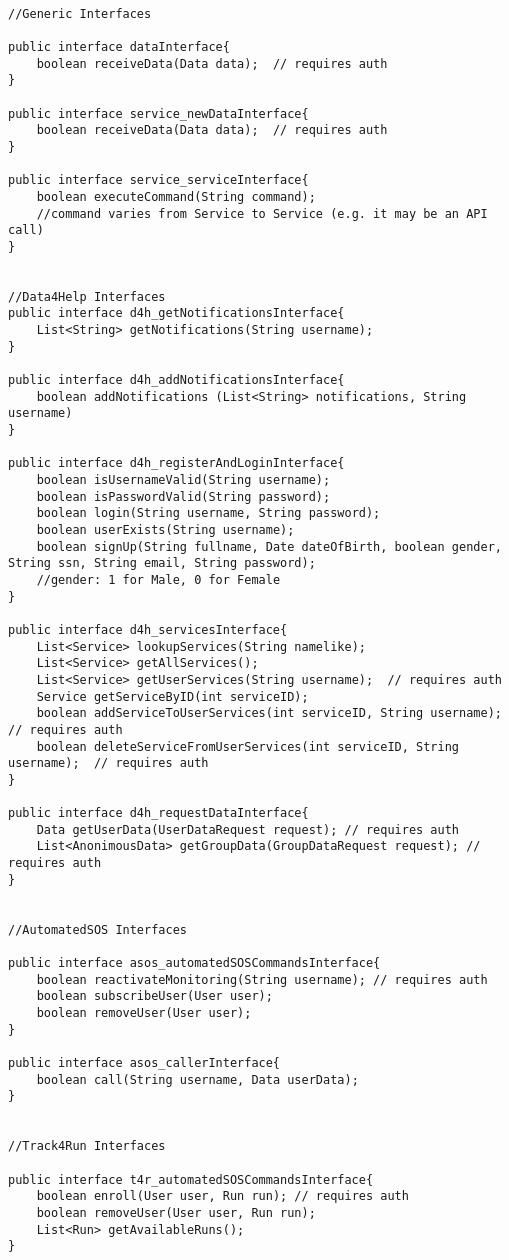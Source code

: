 \documentclass[../../DD.tex]{subfiles}
\begin{document}
\begin{lstlisting}

//Generic Interfaces

public interface dataInterface{
	boolean receiveData(Data data);  // requires auth
}

public interface service_newDataInterface{
	boolean receiveData(Data data);  // requires auth
}

public interface service_serviceInterface{
	boolean executeCommand(String command);
	//command varies from Service to Service (e.g. it may be an API call) 
}


//Data4Help Interfaces
public interface d4h_getNotificationsInterface{
	List<String> getNotifications(String username);
}

public interface d4h_addNotificationsInterface{
	boolean addNotifications (List<String> notifications, String username)
}

public interface d4h_registerAndLoginInterface{
	boolean isUsernameValid(String username);
	boolean isPasswordValid(String password);
	boolean login(String username, String password);
	boolean userExists(String username);
	boolean signUp(String fullname, Date dateOfBirth, boolean gender, String ssn, String email, String password);
	//gender: 1 for Male, 0 for Female
}

public interface d4h_servicesInterface{
	List<Service> lookupServices(String namelike);
	List<Service> getAllServices();
	List<Service> getUserServices(String username);  // requires auth
	Service getServiceByID(int serviceID);
	boolean addServiceToUserServices(int serviceID, String username);  // requires auth
	boolean deleteServiceFromUserServices(int serviceID, String username);  // requires auth
}

public interface d4h_requestDataInterface{
	Data getUserData(UserDataRequest request); // requires auth
	List<AnonimousData> getGroupData(GroupDataRequest request); // requires auth
}


//AutomatedSOS Interfaces

public interface asos_automatedSOSCommandsInterface{
	boolean reactivateMonitoring(String username); // requires auth
	boolean subscribeUser(User user);
	boolean removeUser(User user);
}

public interface asos_callerInterface{
	boolean call(String username, Data userData);
}


//Track4Run Interfaces

public interface t4r_automatedSOSCommandsInterface{
	boolean enroll(User user, Run run); // requires auth
	boolean removeUser(User user, Run run);
	List<Run> getAvailableRuns();
}


\end{lstlisting}
\end{document}
